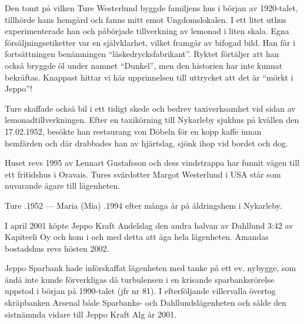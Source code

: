 Den tomt på vilken Ture Westerlund byggde familjens hus i början av 1920-talet, tillhörde hans hemgård och fanns mitt emot Ungdomslokalen. I ett litet uthus experimenterade han och påbörjade tillverkning av lemonad i liten skala. Egna försäljningsetiketter var en självklarhet, vilket framgår av bifogad bild. Han får i fortsättningen benämningen ``läskedrycksfabrikant''. Ryktet förtäljer att han också bryggde öl under namnet ``Dunkel'', men den historien har inte kunnat bekräftas. Knappast hittar vi här upprinnelsen till uttrycket att det är ``mörkt i Jeppo''!

Ture skaffade också bil i ett tidigt skede och bedrev taxiverksamhet vid sidan av lemonadtillverkningen. Efter en taxikörning till Nykarleby sjukhus på kvällen den 17.02.1952, besökte han restaurang von Döbeln för en kopp kaffe innan hemfärden och där drabbades han av hjärtslag, sjönk ihop vid bordet och dog.

Huset revs 1995 av Lennart Gustafsson och dess vindstrappa har funnit vägen till ett fritidshus i Oravais. Tures svärdotter Margot Westerlund i USA står som nuvarande ägare till lägenheten.

Ture .1952 --- Maria (Mia) .1994 efter många år på åldringshem i Nykarleby.



%



%
I april 2001 köpte Jeppo Kraft Andelslag den andra halvan av Dahllund 3:42 av Kapiteeli Oy och kom i och med detta att äga hela lägenheten. Amandas bostadshus revs hösten 2002.


%
Jeppo Sparbank hade införskaffat lägenheten med tanke på ett ev. nybygge, som ändå inte kunde förverkligas då turbulensen i en krisande sparbanksrörelse uppstod i början på 1990-talet (jfr nr 81). I efterföljande villervalla övertog skräpbanken Arsenal både Sparbanks- och Dahllundslägenheten och sålde den sistnämnda vidare till Jeppo Kraft Alg år 2001.


%
\jhvspace{}




